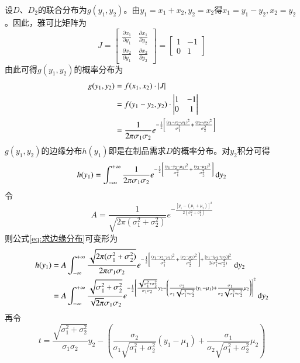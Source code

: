 设$D$、$D_2$的联合分布为$g(y_1,y_2)$。由$y_1=x_1+x_2,y_2=x_2$得$x_1=y_1-y_2,x_2=y_2$。因此，雅可比矩阵为
\[
J = \begin{bmatrix}
\frac{\partial x_1}{\partial y_1} & \frac{\partial x_1}{\partial y_2} \\
\frac{\partial x_2}{\partial y_1} & \frac{\partial x_2}{\partial y_2}
\end{bmatrix} = \begin{bmatrix}
1 & -1 \\
0 & 1
\end{bmatrix}
\]
由此可得$g(y_1,y_2)$的概率分布为
\begin{align}
g(y_1,y_2) &= f(x_1,x_2)\cdot\left|J\right| \notag\\
&= f(y_1-y_2,y_2)\cdot
\begin{vmatrix}
1 & -1 \\
0 & 1
\end{vmatrix} \notag\\
&= \frac{1}{2\pi\sigma_1\sigma_2}e^{-\frac{1}{2}\left[\frac{(y_1-y_2-\mu_1)^2}{\sigma_1^2}+\frac{(y_2-\mu_2)^2}{\sigma_2^2}\right]}
\label{eq:新联合分布}
\end{align}
$g(y_1,y_2)$的边缘分布$h(y_1)$即是在制品需求$D$的概率分布。对$y_2$积分可得
\begin{equation}
h(y_1) = \int_{-\infty}^{+\infty}\frac{1}{2\pi\sigma_1\sigma_2}e^{-\frac{1}{2}\left[\frac{(y_1-y_2-\mu_1)^2}{\sigma_1^2}+\frac{(y_2-\mu_2)^2}{\sigma_2^2}\right]}\operatorname{d\!} y_2
\label{eq:求边缘分布}
\end{equation}
令
\[
A = \frac{1}{\sqrt{2\pi(\sigma_1^2+\sigma_2^2)}}e^{-\frac{[y_1-(\mu_1+\mu_2)]^2}{2(\sigma_1^2+\sigma_2^2)}}
\]
则公式\ref{eq:求边缘分布}可变形为
\begin{align}
h(y_1) &= A\int_{-\infty}^{+\infty}\frac{\sqrt{2\pi(\sigma_1^2+\sigma_2^2)}}{2\pi\sigma_1\sigma_2}e^{-\frac{1}{2}\left[\frac{(y_1-y_2-\mu_1)^2}{\sigma_1^2}+\frac{(y_2-\mu_2)^2}{\sigma_2^2}\right]+\frac{[y_1-(\mu_1+\mu_2)]^2}{2(\sigma_1^2+\sigma_2^2)}}\operatorname{d\!} y_2 \notag\\
&= A\int_{-\infty}^{+\infty}\frac{\sqrt{\sigma_1^2+\sigma_2^2}}{\sqrt{2\pi}\sigma_1\sigma_2}e^{-\frac{1}{2}\left[\frac{\sqrt{\sigma_1^2+\sigma_2^2}}{\sigma_1\sigma_2}y_2-\left(\frac{\sigma_2}{\sigma_1\sqrt{\sigma_1^2+\sigma_2^2}}(y_1-\mu_1)+\frac{\sigma_1}{\sigma_2\sqrt{\sigma_1^2+\sigma_2^2}}\mu_2\right)\right]^2}\operatorname{d\!} y_2
\label{eq:求边缘分布2}
\end{align}
再令
\[
t = \frac{\sqrt{\sigma_1^2+\sigma_2^2}}{\sigma_1\sigma_2}y_2-\left(\frac{\sigma_2}{\sigma_1\sqrt{\sigma_1^2+\sigma_2^2}}(y_1-\mu_1)+\frac{\sigma_1}{\sigma_2\sqrt{\sigma_1^2+\sigma_2^2}}\mu_2\right)
\]
